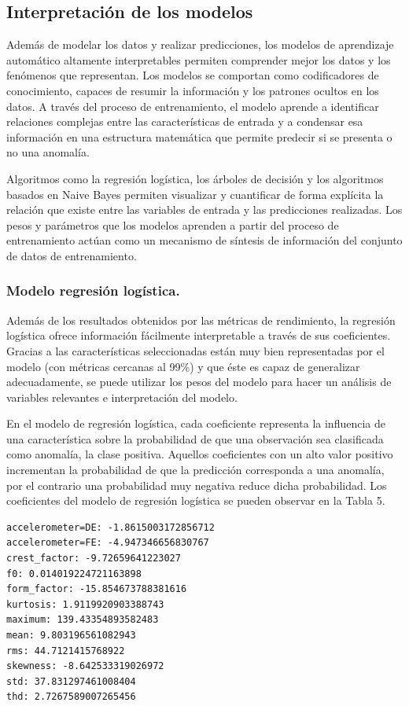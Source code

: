 \documentclass[11pt,a4paper,spanish]{book}
\numberwithin{equation}{chapter}
\numberwithin{figure}{chapter}
\begin{document}
\subsection{Interpretación de los modelos}


Además de modelar los datos y realizar predicciones, 
los modelos de aprendizaje automático altamente 
interpretables permiten comprender mejor los datos y los fenómenos que representan. 
Los modelos se comportan como codificadores de conocimiento, capaces de resumir la 
información y los patrones ocultos en los datos. A través del proceso de entrenamiento, 
el modelo aprende a identificar relaciones complejas entre las características de entrada 
y a condensar esa información en una estructura matemática que permite predecir si se 
presenta o no una anomalía. 


Algoritmos como la regresión logística, los árboles de decisión y los algoritmos basados 
en Naive Bayes permiten visualizar y cuantificar de forma explícita la relación que 
existe entre las variables de entrada y las predicciones realizadas. Los pesos y 
parámetros que los modelos aprenden a partir del proceso de entrenamiento actúan como 
un mecanismo de síntesis de información del conjunto de datos de entrenamiento. 

\subsubsection{Modelo regresión logística.}

Además de los resultados obtenidos por las métricas de rendimiento, la regresión 
logística ofrece información fácilmente interpretable a través de sus coeficientes. 
Gracias a las características seleccionadas están muy bien representadas por el modelo 
(con métricas cercanas al 99\%) y que éste es capaz de generalizar adecuadamente, 
se puede utilizar los pesos del modelo para hacer un análisis de variables relevantes 
e interpretación del modelo.  


En el modelo de regresión logística, cada coeficiente representa la influencia de una 
característica sobre la probabilidad de que una observación sea clasificada como anomalía, 
la clase positiva. Aquellos coeficientes con un alto valor positivo incrementan la 
probabilidad de que la predicción corresponda a una anomalía, por el contrario una 
probabilidad muy negativa reduce dicha probabilidad. Los coeficientes del modelo de 
regresión logística se pueden observar en la Tabla 5. 


\vspace{5mm}
\begin{lstlisting}[language={}, basicstyle=\ttfamily\footnotesize\color{black}, frame=lines]
accelerometer=DE: -1.8615003172856712
accelerometer=FE: -4.947346656830767
crest_factor: -9.72659641223027
f0: 0.014019224721163898
form_factor: -15.854673788381616
kurtosis: 1.9119920903388743
maximum: 139.43354893582483
mean: 9.803196561082943
rms: 44.7121415768922
skewness: -8.642533319026972
std: 37.831297461008404
thd: 2.7267589007265456
\end{lstlisting}
\end{document}
